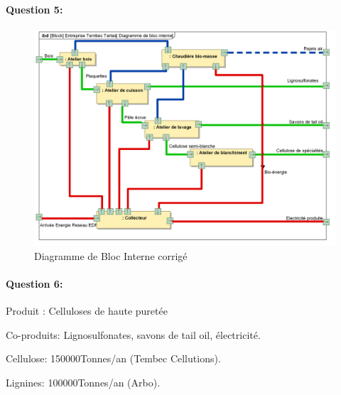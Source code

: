 ~\

\paragraph{Question 5:}


\begin{figure}[!h]
\begin{center}
\includegraphics[width=\linewidth]{img/Tartas_interne_cor}
\caption{Diagramme de Bloc Interne corrigé}
\label{fig:tartas_in_cor}
\end{center}
\end{figure}


\paragraph{Question 6:} 

Produit : Celluloses de haute puretée

Co-produits: Lignosulfonates, savons de tail oil, électricité.

Cellulose: 150000Tonnes/an (Tembec Cellutions).

Lignines: 100000Tonnes/an (Arbo).


